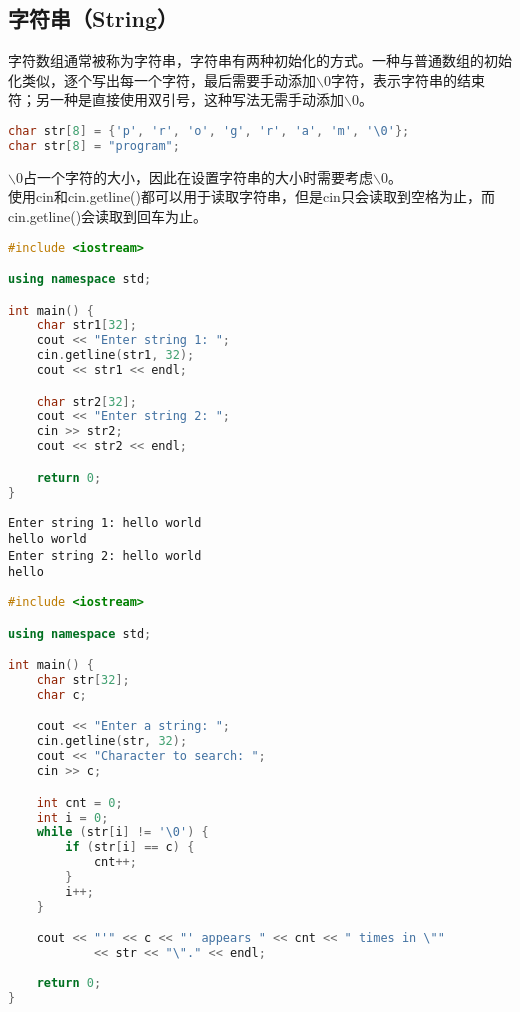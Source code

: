 \vspace{0.5cm}

\subsection{字符串（String）}

字符数组通常被称为字符串，字符串有两种初始化的方式。一种与普通数组的初始化类似，逐个写出每一个字符，最后需要手动添加$ \backslash $0字符，表示字符串的结束符；另一种是直接使用双引号，这种写法无需手动添加$ \backslash $0。

\vspace{-0.5cm}

\begin{lstlisting}[language=C++]
char str[8] = {'p', 'r', 'o', 'g', 'r', 'a', 'm', '\0'};
char str[8] = "program";
\end{lstlisting}

$ \backslash $0占一个字符的大小，因此在设置字符串的大小时需要考虑$ \backslash $0。\\

使用cin和cin.getline()都可以用于读取字符串，但是cin只会读取到空格为止，而cin.getline()会读取到回车为止。\\


\begin{lstlisting}[language=C++]
#include <iostream>

using namespace std;

int main() {
	char str1[32];
	cout << "Enter string 1: ";
	cin.getline(str1, 32);
	cout << str1 << endl;

	char str2[32];
	cout << "Enter string 2: ";
	cin >> str2;
	cout << str2 << endl;

	return 0;
}
\end{lstlisting}

\begin{tcolorbox}
	\begin{verbatim}
Enter string 1: hello world
hello world
Enter string 2: hello world
hello
	\end{verbatim}
\end{tcolorbox}

\vspace{0.5cm}


\begin{lstlisting}[language=C++]
#include <iostream>

using namespace std;

int main() {
	char str[32];
	char c;

	cout << "Enter a string: ";
	cin.getline(str, 32);
	cout << "Character to search: ";
	cin >> c;

	int cnt = 0;
	int i = 0;
	while (str[i] != '\0') {
		if (str[i] == c) {
			cnt++;
		}
		i++;
	}

	cout << "'" << c << "' appears " << cnt << " times in \""
			<< str << "\"." << endl;
			
	return 0;
}
\end{lstlisting}

